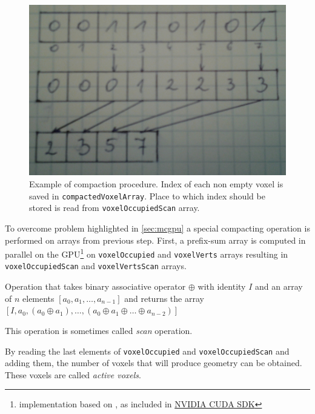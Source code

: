\begin{figure}
	\begin{center}
		\includegraphics[width=\textwidth]{chapters/marchingcubes/compact.jpg}
	\end{center}
	\caption{Example of compaction procedure. Index of each non empty voxel
		is saved in \texttt{compactedVoxelArray}. Place to which index
		should be stored is read from \texttt{voxelOccupiedScan} array.
	}
	\label{fig:mccompact}
\end{figure}

To overcome problem highlighted in \autoref{sec:mcgpu} a special compacting
operation is performed on arrays from previous step. First, a prefix-sum array
is computed in parallel on the GPU\footnote{implementation based on \cite{gpugemsscan},
as included in \href{https://developer.nvidia.com/cuda-downloads}{NVIDIA CUDA SDK}}
on \texttt{voxelOccupied} and \texttt{voxelVerts} arrays resulting in
\texttt{voxelOccupiedScan} and \texttt{voxelVertsScan} arrays.

\begin{defn}
Operation that takes binary associative operator $\oplus$ with identity $I$ and
an array of $n$ elements $[a_0,a_1,\ldots,a_{n-1}]$ and returns the array
$[I,a_0,(a_0\oplus a_1),\ldots,(a_0\oplus a_1 \oplus \ldots \oplus a_{n-2})]$

This operation is sometimes called \emph{scan} operation.
\end{defn}

By reading the last elements of \texttt{voxelOccupied} and
\texttt{voxelOccupiedScan} and adding them, the number of voxels that will
produce geometry can be obtained. These voxels are called \emph{active voxels}.

